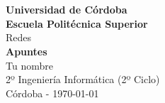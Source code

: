 \setlength{\unitlength}{1 cm} %
\thispagestyle{empty}
\\
\\
\begin{center}
\textbf{{\Huge Universidad de Córdoba}\\[0.5cm]
{\LARGE Escuela Politécnica Superior}}\\[1.25cm]
{\Large Redes}\\[2.3cm]
{\LARGE \textbf{Apuntes}}\\[3.5cm]
{\large Tu nombre}\\[2cm]
2º Ingeniería Informática (2º Ciclo)\\[1cm]
Córdoba - \today
\end{center}